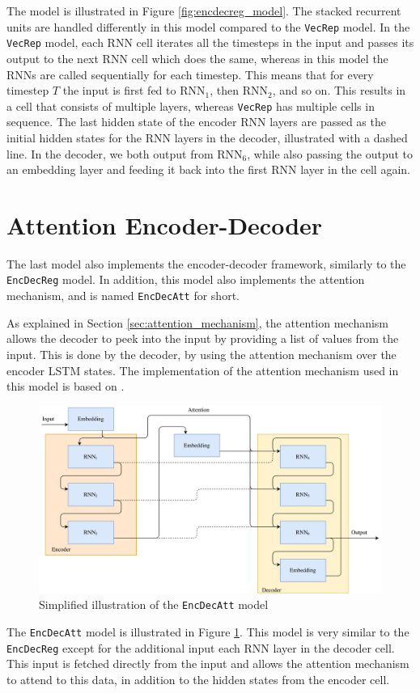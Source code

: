 The model is illustrated in Figure \ref{fig:encdecreg_model}. The stacked recurrent units are handled differently in this model compared to the {\tt VecRep} model. In the {\tt VecRep} model, each RNN cell iterates all the timesteps in the input and passes its output to the next RNN cell which does the same, whereas in this model the RNNs are called sequentially for each timestep. This means that for every timestep \(T\) the input is first fed to \(\text{RNN}_1\), then \(\text{RNN}_2\), and so on. This results in a cell that consists of multiple layers, whereas {\tt VecRep} has multiple cells in sequence. The last hidden state of the encoder RNN layers are passed as the initial hidden states for the RNN layers in the decoder, illustrated with a dashed line. In the decoder, we both output from \(\text{RNN}_6\), while also passing the output to an embedding layer and feeding it back into the first RNN layer in the cell again.


\section{Attention Encoder-Decoder}
\label{sec:attention_encoder_decoder}
The last model also implements the encoder-decoder framework, similarly to the {\tt EncDecReg} model. In addition, this model also implements the attention mechanism, and is named {\tt EncDecAtt} for short.

As explained in Section \ref{sec:attention_mechanism}, the attention mechanism allows the decoder to peek into the input by providing a list of values from the input. This is done by the decoder, by using the attention mechanism over the encoder LSTM states. The implementation of the attention mechanism used in this model is based on \citep{vinyals2015grammar}.

\begin{figure}[!ht]
    \centering
    \includegraphics[width=1\textwidth]{fig/models/encdecatt_model.png}
    \caption{Simplified illustration of the {\tt EncDecAtt} model}
    \label{fig:encdecattg_model}
\end{figure}

The {\tt EncDecAtt} model is illustrated in Figure \ref{fig:encdecattg_model}. This model is very similar to the {\tt EncDecReg} except for the additional input each RNN layer in the decoder cell. This input is fetched directly from the input and allows the attention mechanism to attend to this data, in addition to the hidden states from the encoder cell.